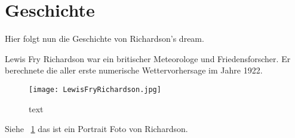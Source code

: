 %
%
%
%
\section{Geschichte\label{geostrophisch:section:teil0}}

Hier folgt nun die Geschichte von Richardson's dream. 

Lewis Fry Richardson war ein britischer Meteorologe und Friedensforscher.
Er berechnete die aller erste numerische Wettervorhersage im Jahre 1922.

\begin{figure}[h]
	\centering
	\texttt{[image: LewisFryRichardson.jpg]}
	\caption{text}
	\label{bild:portraitRichi}
\end{figure}

Siehe ~\ref{bild:portraitRichi} das ist ein Portrait Foto von Richardson. 



